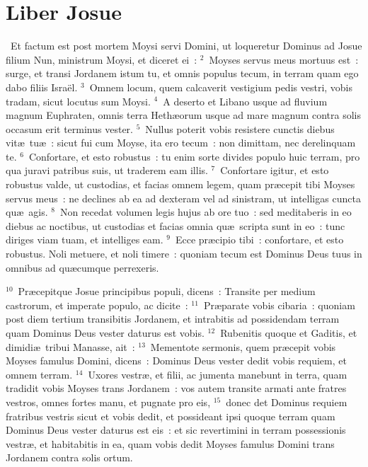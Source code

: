{\centering \section*{Liber Josue}}\thispagestyle{empty}

~\lettrine[lines=10,image=true,loversize=0.05,lraise=-0.03]{E}{}t factum est post mortem Moysi servi Domini, ut loqueretur Dominus ad Josue filium Nun, ministrum Moysi, et diceret ei~:
${}^{2}$~Moyses servus meus mortuus est~: surge, et transi Jordanem istum tu, et omnis populus tecum, in terram quam ego dabo filiis Isra\"el.
${}^{3}$~Omnem locum, quem calcaverit vestigium pedis vestri, vobis tradam, sicut locutus sum Moysi.
${}^{4}$~A deserto et Libano usque ad fluvium magnum Euphraten, omnis terra Heth\ae orum usque ad mare magnum contra solis occasum erit terminus vester.
${}^{5}$~Nullus poterit vobis resistere cunctis diebus vit\ae\ tu\ae~: sicut fui cum Moyse, ita ero tecum~: non dimittam, nec derelinquam te.
${}^{6}$~Confortare, et esto robustus~: tu enim sorte divides populo huic terram, pro qua juravi patribus suis, ut traderem eam illis.
${}^{7}$~Confortare igitur, et esto robustus valde, ut custodias, et facias omnem legem, quam pr\ae cepit tibi Moyses servus meus~: ne declines ab ea ad dexteram vel ad sinistram, ut intelligas cuncta qu\ae\ agis.
${}^{8}$~Non recedat volumen legis hujus ab ore tuo~: sed meditaberis in eo diebus ac noctibus, ut custodias et facias omnia qu\ae\ scripta sunt in eo~: tunc diriges viam tuam, et intelliges eam.
${}^{9}$~Ecce pr\ae cipio tibi~: confortare, et esto robustus. Noli metuere, et noli timere~: quoniam tecum est Dominus Deus tuus in omnibus ad qu\ae cumque perrexeris.


${}^{10}$~Pr\ae cepitque Josue principibus populi, dicens~: Transite per medium castrorum, et imperate populo, ac dicite~:
${}^{11}$~Pr\ae parate vobis cibaria~: quoniam post diem tertium transibitis Jordanem, et intrabitis ad possidendam terram quam Dominus Deus vester daturus est vobis.
${}^{12}$~Rubenitis quoque et Gaditis, et dimidi\ae\ tribui Manasse, ait~:
${}^{13}$~Mementote sermonis, quem pr\ae cepit vobis Moyses famulus Domini, dicens~: Dominus Deus vester dedit vobis requiem, et omnem terram.
${}^{14}$~Uxores vestr\ae , et filii, ac jumenta manebunt in terra, quam tradidit vobis Moyses trans Jordanem~: vos autem transite armati ante fratres vestros, omnes fortes manu, et pugnate pro eis,
${}^{15}$~donec det Dominus requiem fratribus vestris sicut et vobis dedit, et possideant ipsi quoque terram quam Dominus Deus vester daturus est eis~: et sic revertimini in terram possessionis vestr\ae , et habitabitis in ea, quam vobis dedit Moyses famulus Domini trans Jordanem contra solis ortum.


